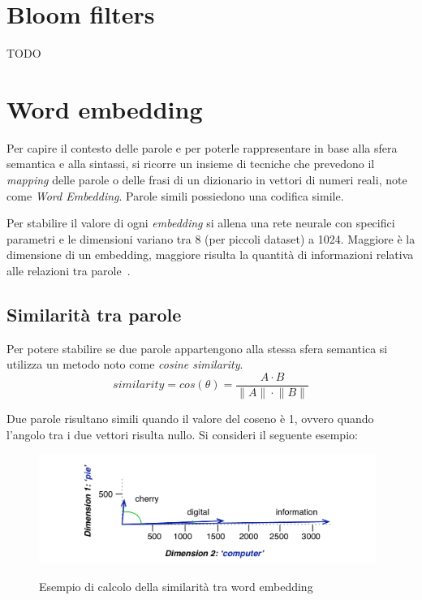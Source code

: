 \section{Bloom filters}

TODO

\section{Word embedding}
Per capire il contesto delle parole e per poterle rappresentare in base alla sfera semantica e alla sintassi, si ricorre un insieme di tecniche che prevedono il \textit{mapping} delle parole o delle frasi di un dizionario in vettori di numeri reali, note come \emph{Word Embedding}.
Parole simili possiedono una codifica simile.


Per stabilire il valore di ogni \textit{embedding} si allena una rete neurale con specifici parametri e le dimensioni variano tra 8 (per piccoli dataset) a 1024. Maggiore è la dimensione di un embedding, maggiore risulta la quantità di informazioni relativa alle relazioni tra parole~\cite{tensword}.

\subsection{Similarità tra parole}

Per potere stabilire se due parole appartengono alla stessa sfera semantica si utilizza un metodo noto come \emph{cosine similarity}.
\begin{equation}
    similarity = cos(\theta) = \frac{A\cdot{B}}{\|A\|\cdot{\|B\|}}
\end{equation}

Due parole risultano simili quando il valore del coseno è 1, ovvero quando l'angolo tra i due vettori risulta nullo. Si consideri il seguente esempio:

\begin{figure}[h]
    \centering
    \includegraphics[width=11cm]{./immagini/cosine_similarity_esempio.png}
    \label{cosine}
    \caption{Esempio di calcolo della similarità tra word embedding~\cite{cosine}}
\end{figure}

